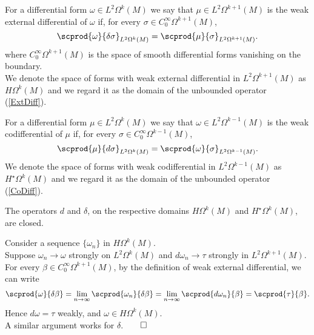 \documentclass{ifacconf}
\newcommand{\drh}[2]{\Omega^{#2}(#1)}
\begin{document}
\begin{defn}
    For a differential form $\omega\in L^2\drh{M}{k}$ we say that $\mu\in L^2\drh{M}{k+1}$ is the weak external differential of $\omega$ if, for every $\sigma\in C^{\infty}_0\drh{M}{k+1}$,
        \begin{equation}\label{wexd}
        \scprod{\omega}{\delta \sigma}_{L^2\drh{M}{k}}=\scprod{\mu}{\sigma}_{L^2\drh{M}{k+1}}.
        \end{equation}
    where $C^{\infty}_0\drh{M}{k+1}$ is the space of smooth differential forms vanishing on the boundary.\\
    We denote the space of forms with weak external differential in $L^2\drh{M}{k+1}$ as $H\drh{M}{k}$ and we regard it as the domain of the unbounded operator (\ref{ExtDiff}).\\
\end{defn}
\begin{defn}\label{codi}
    For a differential form $\mu\in L^2\drh{M}{k}$ we say that $\omega\in L^2\drh{M}{k-1}$ is the weak codifferential of $\mu$ if, for every $\sigma\in C^{\infty}_0\drh{M}{k-1}$,
        \begin{equation}\label{wcod}
        \scprod{\mu}{d\sigma}_{L^2\drh{M}{k}}=\scprod{\omega}{\sigma}_{L^2\drh{M}{k-1}}.
        \end{equation}
    We denote the space of forms with weak codifferential in $L^2\drh{M}{k-1}$ as $H^{\star}\drh{M}{k}$ and we regard it as the domain of the unbounded operator (\ref{CoDiff}).
\end{defn}
\begin{prop}\label{closeddom}
    The operators $d$ and $\delta$, on the respective domains $H\drh{M}{k}$ and $H^{\star}\drh{M}{k}$, are closed.
\begin{pf}
    Consider a sequence $\{\omega_n\}$ in $H\drh{M}{k}$.\\
    Suppose $\omega_n\rightarrow\omega$ strongly on $L^2\drh{M}{k}$ and $d\omega_n\rightarrow \tau$ strongly in $L^2\drh{M}{k+1}$.\\
    For every $\beta\in C^{\infty}_0\drh{M}{k+1}$, by the definition of weak external differential, we can write
\begin{align*}
  \scprod{\omega}{\delta\beta}=\lim_{n\rightarrow \infty}\scprod{\omega_n}{\delta \beta} = \lim_{n\rightarrow\infty} \scprod{d\omega_n}{\beta}=\scprod{\tau}{\beta}.
\end{align*}
Hence $d\omega=\tau$ weakly, and $\omega\in H\drh{M}{k}$.\\
A similar argument works for $\delta$.\hfill$\qed$
\end{pf}
\end{prop}
\end{document}

